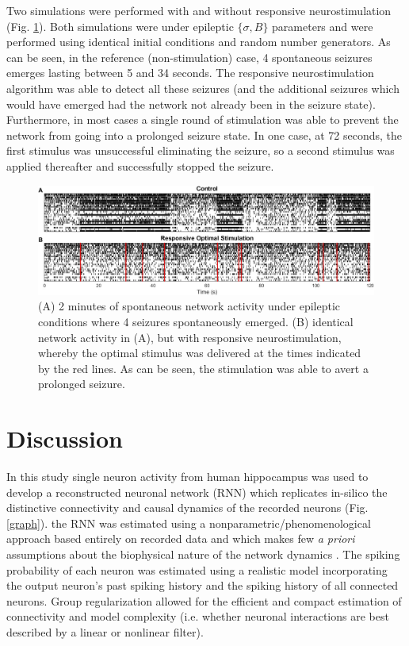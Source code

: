 \documentclass[11pt,a4paper,final]{article}
\begin{document}
Two simulations were performed with and without responsive neurostimulation (Fig. \ref{RS}).
Both simulations were under epileptic $\{\sigma,B\}$ parameters and were performed using identical initial conditions and random number generators.
As can be seen, in the reference (non-stimulation) case, 4 spontaneous seizures emerges lasting between 5 and 34 seconds.
The responsive neurostimulation algorithm was able to detect all these seizures (and the additional seizures which would have emerged had the network not already been in the seizure state).
Furthermore, in most cases a single round of stimulation was able to prevent the network from going into a prolonged seizure state.
In one case, at 72 seconds, the first stimulus was unsuccessful eliminating the seizure, so a second stimulus was applied thereafter and successfully stopped the seizure.

\begin{figure}[!ht]
\centering
\includegraphics[width=180mm]{RS}
\caption[Responsive Stimulation]{
(A) 2 minutes of spontaneous network activity under epileptic conditions where 4 seizures spontaneously emerged.
(B) identical network activity in (A), but with responsive neurostimulation, whereby the optimal \len{} stimulus was delivered at the times indicated by the red lines. As can be seen, the stimulation was able to avert a prolonged seizure.}
\label{RS}
\end{figure}

\section{Discussion \label{disc}}

In this study single neuron activity from human hippocampus was used to develop a reconstructed neuronal network (RNN) which replicates in-silico the distinctive connectivity and causal dynamics of the recorded \nn{} neurons (Fig. \ref{graph}).
the RNN was estimated using a nonparametric/phenomenological approach based entirely on recorded data and which makes few \textit{a priori} assumptions about the biophysical nature of the network dynamics \citep{pillow08}.
The spiking probability of each neuron was estimated using a realistic model incorporating the output neuron's past spiking history and the spiking history of all connected neurons.
Group regularization allowed for the efficient and compact estimation of connectivity and model complexity (i.e. whether neuronal interactions are best described by a linear or nonlinear filter).
\end{document}
